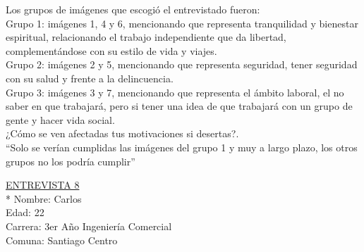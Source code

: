 Los grupos de imágenes que escogió el entrevistado fueron:\\

Grupo 1: imágenes 1, 4 y 6, mencionando que representa tranquilidad y bienestar espiritual, relacionando el trabajo independiente que da libertad, complementándose con su estilo de vida y viajes.  \\

Grupo 2: imágenes 2 y 5, mencionando que representa seguridad, tener seguridad con su salud y frente a la delincuencia.\\

Grupo 3: imágenes 3 y 7, mencionando que representa el ámbito laboral, el no saber en que trabajará, pero si tener una idea de que trabajará con un grupo de gente y hacer vida social.\\

¿Cómo se ven afectadas tus motivaciones si desertas?.\\

``Solo se verían cumplidas las imágenes del grupo 1 y muy a largo plazo, los otros grupos no los podría cumplir''

\newpage
\underline {ENTREVISTA 8}\\*
Nombre: Carlos\\
Edad: 22 \\
Carrera: 3er Año Ingeniería Comercial\\
Comuna: Santiago Centro\\

